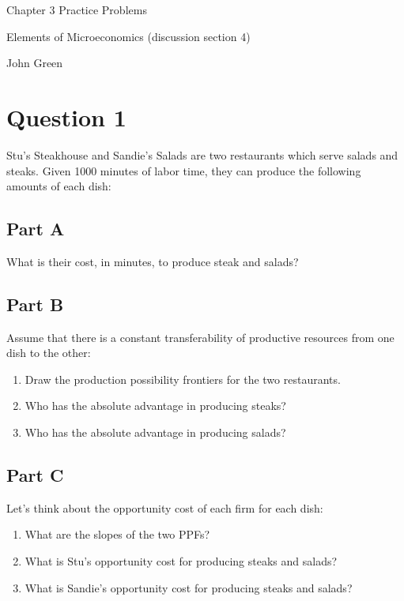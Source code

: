 \documentclass[12pt]{article}
\begin{document}
\begin{center}
\Large Chapter 3 Practice Problems

\medskip

\normalsize Elements of Microeconomics (discussion section 4)

\medskip

\small John Green
\end{center}

\medskip

\section*{Question 1}
Stu's Steakhouse and Sandie's Salads are two restaurants which serve salads and steaks. Given 1000 minutes of labor time, they can produce the following amounts of each dish:



\subsection*{Part A}

What is their cost, in minutes, to produce steak and salads?

\subsection*{Part B}
Assume that there is a constant transferability of productive resources from one dish to the other:
\begin{enumerate}
    \item Draw the production possibility frontiers for the two restaurants.
    \item Who has the absolute advantage in producing steaks?
    \item Who has the absolute advantage in producing salads?
\end{enumerate}

\subsection*{Part C}
Let's think about the opportunity cost of each firm for each dish:
\begin{enumerate}
    \item What are the slopes of the two PPFs?
    \item What is Stu's opportunity cost for producing steaks and salads?
    \item What is Sandie's opportunity cost for producing steaks and salads?
\end{enumerate}
\end{document}
